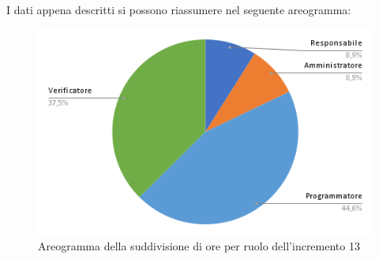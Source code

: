 \pagebreak
I dati appena descritti si possono riassumere nel seguente areogramma:
\begin{figure}[!h]
    \vspace{5px}
    \includegraphics[scale=0.5]{../../../Images/Diagrammi/Diagramma a torta/areogrammaIncremento13.png}
    \centering
    \caption{Areogramma della suddivisione di ore per ruolo dell'incremento 13}
\end{figure}

